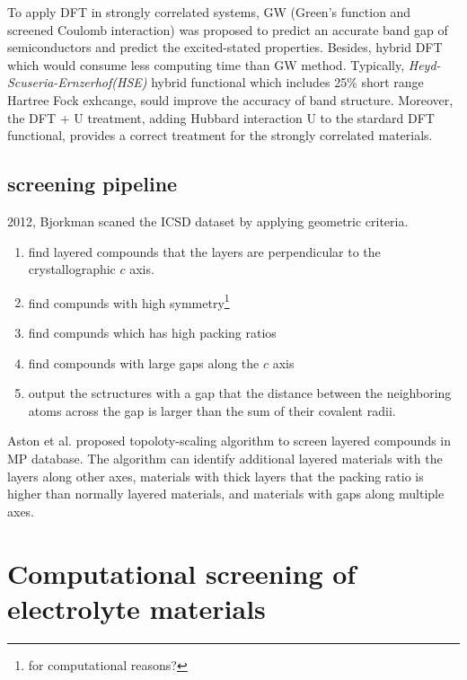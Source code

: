 \documentclass[a4paper, 11pt]{article}
\numberwithin{equation}{subsection}
\begin{document}
To apply DFT in strongly correlated systems, GW (Green's function and screened Coulomb interaction) was proposed to predict an accurate band gap of semiconductors and predict the excited-stated properties. Besides, hybrid DFT which would consume less computing time than GW method. Typically, \textit{Heyd-Scuseria-Ernzerhof(HSE)} hybrid functional which includes 25\% short range Hartree Fock exhcange, sould improve the accuracy of band structure. Moreover, the DFT + U treatment, adding Hubbard interaction U to the stardard DFT functional, provides a correct treatment for the strongly correlated materials.

\subsection{screening pipeline}

2012, Bjorkman scaned the ICSD dataset by applying geometric criteria.

\begin{enumerate}
  \item find layered compounds that the layers are perpendicular to the crystallographic $c$ axis.
  \item find compunds with high symmetry\footnote{for computational reasons?}
  \item find compunds which has high packing ratios
  \item find compounds with large gaps along the $c$ axis
  \item output the sctructures with a gap that the distance between the neighboring atoms across the gap is larger than the sum of their covalent radii.
\end{enumerate}

Aston et al. proposed topoloty-scaling algorithm to screen layered compounds in MP database. The algorithm can identify additional layered materials with the layers along other axes, materials with thick layers that the packing ratio is higher than normally layered materials, and materials with gaps along multiple axes.


\section{Computational screening of electrolyte materials}
\end{document}
